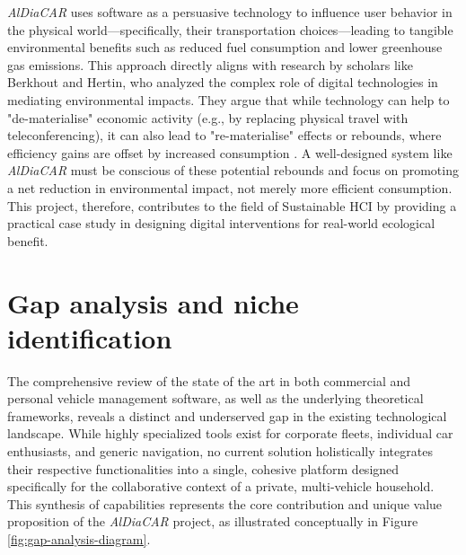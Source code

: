 \textgap

\textit{AlDiaCAR} uses software as a persuasive technology to influence user behavior in the physical world—specifically, their transportation choices—leading to tangible environmental benefits such as reduced fuel consumption and lower greenhouse gas emissions. This approach directly aligns with research by scholars like Berkhout and Hertin, who analyzed the complex role of digital technologies in mediating environmental impacts. They argue that while technology can help to "de-materialise" economic activity (e.g., by replacing physical travel with teleconferencing), it can also lead to "re-materialise" effects or rebounds, where efficiency gains are offset by increased consumption \cite{berkhout2004de}. A well-designed system like \textit{AlDiaCAR} must be conscious of these potential rebounds and focus on promoting a net reduction in environmental impact, not merely more efficient consumption. This project, therefore, contributes to the field of Sustainable HCI by providing a practical case study in designing digital interventions for real-world ecological benefit.

\section{Gap analysis and niche identification}
The comprehensive review of the state of the art in both commercial and personal vehicle management software, as well as the underlying theoretical frameworks, reveals a distinct and underserved gap in the existing technological landscape. While highly specialized tools exist for corporate fleets, individual car enthusiasts, and generic navigation, no current solution holistically integrates their respective functionalities into a single, cohesive platform designed specifically for the collaborative context of a private, multi-vehicle household. This synthesis of capabilities represents the core contribution and unique value proposition of the \textit{AlDiaCAR} project, as illustrated conceptually in Figure \ref{fig:gap-analysis-diagram}.

